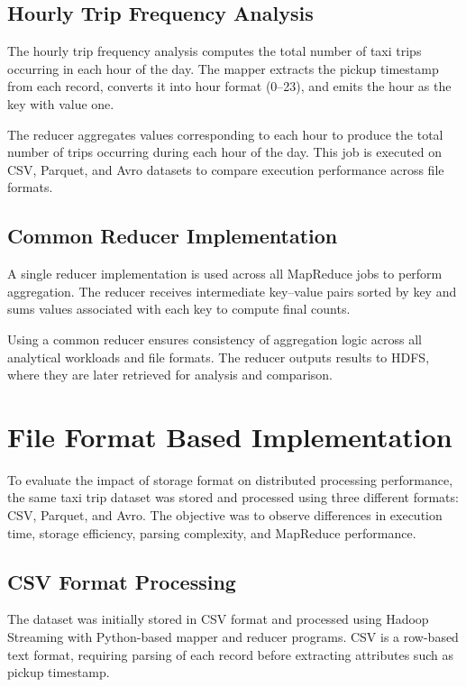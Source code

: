 \documentclass[12pt,a4paper]{report}
\begin{document}
\subsection{Hourly Trip Frequency Analysis}

The hourly trip frequency analysis computes the total number of taxi trips occurring in
each hour of the day. The mapper extracts the pickup timestamp from each record,
converts it into hour format (0–23), and emits the hour as the key with value one.

The reducer aggregates values corresponding to each hour to produce the total number
of trips occurring during each hour of the day. This job is executed on CSV, Parquet, and
Avro datasets to compare execution performance across file formats.


\subsection{Common Reducer Implementation}

A single reducer implementation is used across all MapReduce jobs to perform
aggregation. The reducer receives intermediate key–value pairs sorted by key and sums
values associated with each key to compute final counts.

Using a common reducer ensures consistency of aggregation logic across all analytical
workloads and file formats. The reducer outputs results to HDFS, where they are later
retrieved for analysis and comparison.
\clearpage
\section{File Format Based Implementation}

To evaluate the impact of storage format on distributed processing performance,
the same taxi trip dataset was stored and processed using three different formats:
CSV, Parquet, and Avro. The objective was to observe differences in execution
time, storage efficiency, parsing complexity, and MapReduce performance.

\subsection{CSV Format Processing}

The dataset was initially stored in CSV format and processed using Hadoop Streaming
with Python-based mapper and reducer programs. CSV is a row-based text format,
requiring parsing of each record before extracting attributes such as pickup timestamp.
\end{document}

